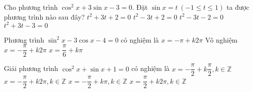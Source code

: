 \begin{ex}%
	Cho phương trình $ \cos^2 x+3\sin x-3=0 $. Đặt $ \sin x=t\ (-1\leq t\leq 1) $ ta được phương trình nào sau đây?
	\choice
	{$ t^2+3t+2=0 $}
	{\True $ t^2-3t+2=0 $}
	{$ t^2-3t-2=0 $}
	{$ t^2+3t-3=0 $}
\end{ex}


\begin{ex}%
	Phương trình $\sin^2x-3\cos x-4=0$ có nghiệm là
	\choice
	{$x=-\pi +k2\pi$}
	{\True Vô nghiệm}
	{$x=-\dfrac{\pi}{2} +k2\pi$}
	{$x=\dfrac{\pi}{6} +k\pi$}
\end{ex}


\begin{ex}%
	Giải phương trình $ \cos^2x+\sin x+1=0 $ có nghiệm là
	\choice
	{$ x=-\dfrac{\pi}{2}+k\dfrac{\pi}{2},k\in\mathbb{Z} $}
	{\True $ x=-\dfrac{\pi}{2}+k2\pi,k\in\mathbb{Z} $}
	{$ x=-\dfrac{\pi}{2}+k\pi,k\in\mathbb{Z} $}
	{$ x=\dfrac{\pi}{2}+k2\pi,k\in\mathbb{Z} $}
\end{ex}

